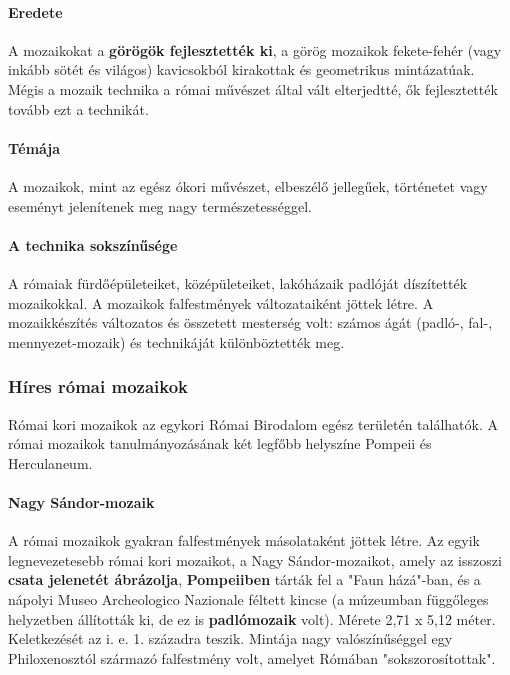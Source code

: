 \paragraph{Eredete}
A mozaikokat a \textbf{görögök fejlesztették ki}, a görög mozaikok fekete-fehér (vagy inkább sötét és világos) kavicsokból kirakottak és geometrikus mintázatúak. Mégis a mozaik technika a római művészet által vált elterjedtté, ők fejlesztették tovább ezt a technikát. 

\paragraph{Témája}
A mozaikok, mint az egész ókori művészet, elbeszélő jellegűek, történetet vagy eseményt jelenítenek meg nagy természetességgel. 

\paragraph{A technika sokszínűsége}
A rómaiak fürdőépületeiket, középületeiket, lakóházaik padlóját díszítették mozaikokkal. A mozaikok falfestmények változataiként jöttek létre. A mozaikkészítés változatos és összetett mesterség volt: számos ágát (padló-, fal-, mennyezet-mozaik) és technikáját különböztették meg.

\subsubsection*{Híres római mozaikok}

Római kori mozaikok az egykori Római Birodalom egész területén találhatók. A római mozaikok tanulmányozásának két legfőbb helyszíne Pompeii és Herculaneum.

\paragraph{Nagy Sándor-mozaik}
A római mozaikok gyakran falfestmények másolataként jöttek létre. Az egyik legnevezetesebb római kori mozaikot, a Nagy Sándor-mozaikot, amely az isszoszi \textbf{csata jelenetét ábrázolja}, \textbf{Pompeiiben} tárták fel a "Faun házá"-ban, és a nápolyi Museo Archeologico Nazionale féltett kincse (a múzeumban függőleges helyzetben állították ki, de ez is \textbf{padlómozaik} volt). Mérete 2,71 x 5,12 méter. Keletkezését az i. e. 1. századra teszik. Mintája nagy valószínűséggel egy Philoxenosztól származó falfestmény volt, amelyet Rómában "sokszorosítottak".



